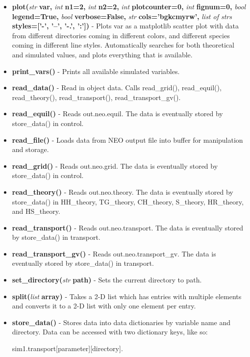\documentclass{article}
\begin{document}
\begin{itemize}
\begin{itemize}
\item \textbf{plot(}\emph{str} \textbf{var, }\emph{int} \textbf{n1=2, }\emph{int} \textbf{n2=2,} \emph{int} \textbf{plotcounter=0,} \emph{int} \textbf{fignum=0,} \emph{bool} \textbf{legend=True,} \emph{bool} \textbf{verbose=False,} \emph{str} \textbf{cols='bgkcmyrw',} \emph{list of strs} \textbf{styles=['-', '--', '-.', ':'])} - Plots var as a matplotlib scatter plot with data from different directories coming in different colors, and different species coming in different line styles.  Automatically searches for both theoretical and simulated values, and plots everything that is available.
\item \textbf{print\_vars()} - Prints all available simulated variables.
\item \textbf{read\_data()} - Read in object data.  Calls read\_grid(), read\_equil(), read\_theory(), read\_transport(), read\_transport\_gv().
\item \textbf{read\_equil()} - Reads out.neo.equil.  The data is eventually stored by store\_data() in control.
\item \textbf{read\_file()} - Loads data from NEO output file into buffer for manipulation and storage.
\item \textbf{read\_grid()} - Reads out.neo.grid.  The data is eventually stored by store\_data() in control.
\item \textbf{read\_theory()} - Reads out.neo.theory.  The data is eventually stored by store\_data() in HH\_theory, TG\_theory, CH\_theory, S\_theory, HR\_theory, and HS\_theory.
\item \textbf{read\_transport()} - Reads out.neo.transport.  The data is eventually stored by store\_data() in transport.
\item \textbf{read\_transport\_gv()} - Reads out.neo.transport\_gv.  The data is eventually stored by store\_data() in transport.
\item \textbf{set\_directory(}\emph{str} \textbf{path)} - Sets the current directory to path.
\item \textbf{split(}\emph{list} \textbf{array)} - Takes a 2-D list which has entries with multiple elements and converts it to a 2-D list with only one element per entry.
\item \textbf{store\_data()} - Stores data into data dictionaries by variable name and directory.  Data can be accessed with two dictionary keys, like so:

sim1.transport[parameter][directory].
\end{itemize}
\end{itemize}
\end{document}
